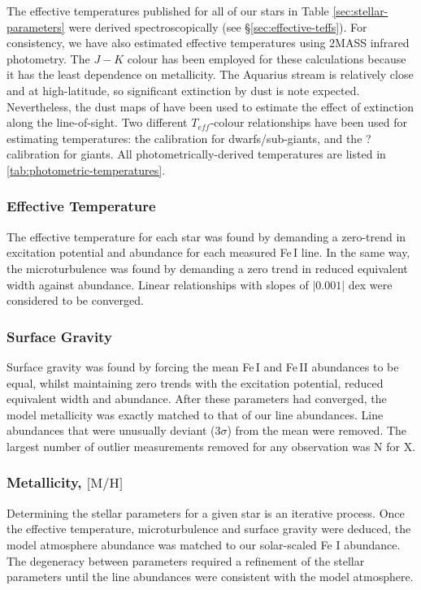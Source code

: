 \documentclass{emulateapj}
\begin{document}
The effective temperatures published for all of our stars in Table \ref{sec:stellar-parameters} were derived spectroscopically (see \S\ref{sec:effective-teffs}). For consistency, we have also estimated effective temperatures using 2MASS infrared photometry. The $J-K$ colour has been employed for these calculations because it has the least dependence on metallicity. The Aquarius stream is relatively close and at high-latitude, so significant extinction by dust is note expected. Nevertheless, the dust maps of \citet{Schlegel;et-al_1998} have been used to estimate the effect of extinction along the line-of-sight. Two different $T_{eff}$-colour relationships have been used for estimating temperatures: the \citet{Alonso;et-al_1999} calibration for dwarfs/sub-giants, and the ? calibration for giants. All photometrically-derived temperatures are listed in \ref{tab:photometric-temperatures}. 

\subsubsection{Effective Temperature}

The effective temperature for each star was found by demanding a zero-trend in excitation potential and abundance for each measured Fe\,I line. In the same way, the microturbulence was found by demanding a zero trend in reduced equivalent width against abundance. Linear relationships with slopes of $|0.001|$ dex were considered to be converged. 

\subsubsection{Surface Gravity}

Surface gravity was found by forcing the mean Fe\,I and Fe\,II abundances to be equal, whilst maintaining zero trends with the excitation potential, reduced equivalent width and abundance. After these parameters had converged, the model metallicity was exactly matched to that of our line abundances. Line abundances that were unusually deviant ($3\sigma$) from the mean were removed. The largest number of outlier measurements removed for any observation was N for X.

\subsubsection{Metallicity, $\mbox{[M/H]}$}
Determining the stellar parameters for a given star is an iterative process. Once the effective temperature, microturbulence and surface gravity were deduced, the model atmosphere abundance was matched to our solar-scaled Fe \textsc{I} abundance. The degeneracy between parameters required a refinement of the stellar parameters until the line abundances were consistent with the model atmosphere.
\end{document}
